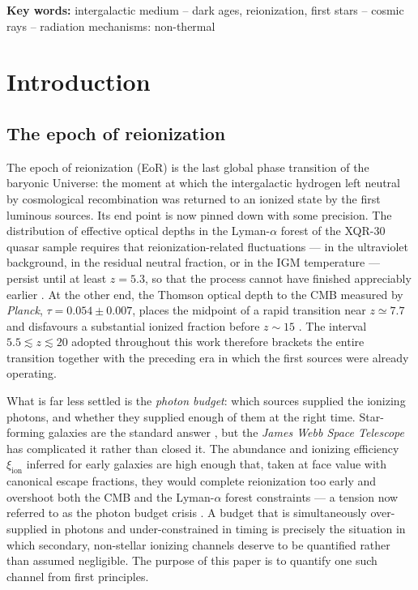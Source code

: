\documentclass[twocolumn]{article}
\begin{document}
\smallskip
\noindent\textbf{Key words:} intergalactic medium -- dark ages, reionization,
first stars -- cosmic rays -- radiation mechanisms: non-thermal

\section{Introduction}

\subsection{The epoch of reionization}

The epoch of reionization (EoR) is the last global phase transition of the
baryonic Universe: the moment at which the intergalactic hydrogen left neutral
by cosmological recombination was returned to an ionized state by the first
luminous sources. Its end point is now pinned down with some precision. The
distribution of effective optical depths in the \mbox{Lyman-$\alpha$} forest of
the XQR-30 quasar sample requires that reionization-related fluctuations --- in
the ultraviolet background, in the residual neutral fraction, or in the IGM
temperature --- persist until at least $z = 5.3$, so that the process cannot
have finished appreciably earlier \citep{Bosman2022}. At the other end, the
Thomson optical depth to the CMB measured by \emph{Planck},
$\tau = 0.054 \pm 0.007$, places the midpoint of a rapid transition near
$z \simeq 7.7$ and disfavours a substantial ionized fraction before
$z \sim 15$ \citep{Planck2020}. The interval $5.5 \lesssim z \lesssim 20$
adopted throughout this work therefore brackets the entire transition together
with the preceding era in which the first sources were already operating.

What is far less settled is the \emph{photon budget}: which sources supplied
the ionizing photons, and whether they supplied enough of them at the right
time. Star-forming galaxies are the standard answer \citep{Robertson2022}, but
the \emph{James Webb Space Telescope} has complicated it rather than closed it.
The abundance and ionizing efficiency $\xi_{\mathrm{ion}}$ inferred for early
galaxies are high enough that, taken at face value with canonical escape
fractions, they would complete reionization too early and overshoot both the
CMB and the \mbox{Lyman-$\alpha$} forest constraints --- a tension now referred
to as the photon budget crisis \citep{Munoz2024}. A budget that is
simultaneously over-supplied in photons and under-constrained in timing is
precisely the situation in which secondary, non-stellar ionizing channels
deserve to be quantified rather than assumed negligible. The purpose of this
paper is to quantify one such channel from first principles.
\end{document}
